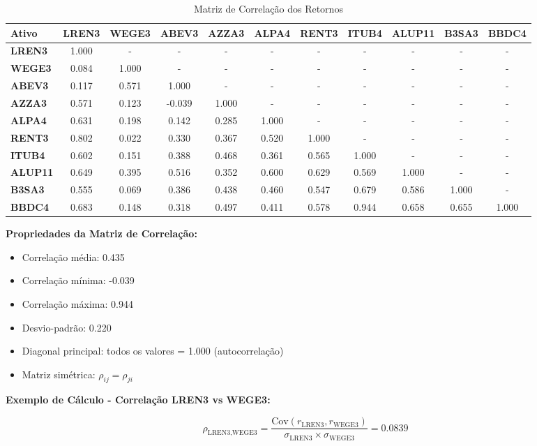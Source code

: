 \begin{table}[H]
\centering
\caption{Matriz de Correlação dos Retornos}
\tiny
\begin{tabular}{|l|c|c|c|c|c|c|c|c|c|c|}
\hline
\textbf{Ativo} & \textbf{LREN3} & \textbf{WEGE3} & \textbf{ABEV3} & \textbf{AZZA3} & \textbf{ALPA4} & \textbf{RENT3} & \textbf{ITUB4} & \textbf{ALUP11} & \textbf{B3SA3} & \textbf{BBDC4} \\
\hline
\textbf{LREN3} & 1.000 & - & - & - & - & - & - & - & - & - \\
\textbf{WEGE3} & 0.084 & 1.000 & - & - & - & - & - & - & - & - \\
\textbf{ABEV3} & 0.117 & 0.571 & 1.000 & - & - & - & - & - & - & - \\
\textbf{AZZA3} & 0.571 & 0.123 & -0.039 & 1.000 & - & - & - & - & - & - \\
\textbf{ALPA4} & 0.631 & 0.198 & 0.142 & 0.285 & 1.000 & - & - & - & - & - \\
\textbf{RENT3} & 0.802 & 0.022 & 0.330 & 0.367 & 0.520 & 1.000 & - & - & - & - \\
\textbf{ITUB4} & 0.602 & 0.151 & 0.388 & 0.468 & 0.361 & 0.565 & 1.000 & - & - & - \\
\textbf{ALUP11} & 0.649 & 0.395 & 0.516 & 0.352 & 0.600 & 0.629 & 0.569 & 1.000 & - & - \\
\textbf{B3SA3} & 0.555 & 0.069 & 0.386 & 0.438 & 0.460 & 0.547 & 0.679 & 0.586 & 1.000 & - \\
\textbf{BBDC4} & 0.683 & 0.148 & 0.318 & 0.497 & 0.411 & 0.578 & 0.944 & 0.658 & 0.655 & 1.000 \\
\hline
\end{tabular}
\end{table}

\textbf{Propriedades da Matriz de Correlação:}
\begin{itemize}
    \item Correlação média: 0.435
    \item Correlação mínima: -0.039
    \item Correlação máxima: 0.944
    \item Desvio-padrão: 0.220
    \item Diagonal principal: todos os valores = 1.000 (autocorrelação)
    \item Matriz simétrica: $\rho_{ij} = \rho_{ji}$
\end{itemize}

\textbf{Exemplo de Cálculo - Correlação LREN3 vs WEGE3:}

\begin{equation}
\rho_{\text{LREN3,WEGE3}} = \frac{\text{Cov}(r_{\text{LREN3}}, r_{\text{WEGE3}})}{\sigma_{\text{LREN3}} \times \sigma_{\text{WEGE3}}} = 0.0839
\end{equation}

